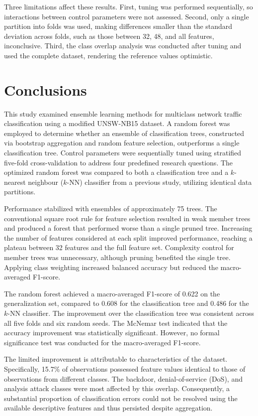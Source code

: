\documentclass[conference]{IEEEtran}
\begin{document}
Three limitations affect these results. First, tuning was performed sequentially, so interactions between control parameters were not assessed. Second, only a single partition into folds was used, making differences smaller than the standard deviation across folds, such as those between 32, 48, and all features, inconclusive. Third, the class overlap analysis was conducted after tuning and used the complete dataset, rendering the reference values optimistic.

\section{Conclusions}\label{sec:conclusions}
This study examined ensemble learning methods for multiclass network traffic classification using a modified UNSW-NB15 dataset. A random forest was employed to determine whether an ensemble of classification trees, constructed via bootstrap aggregation and random feature selection, outperforms a single classification tree. Control parameters were sequentially tuned using stratified five-fold cross-validation to address four predefined research questions. The optimized random forest was compared to both a classification tree and a $k$-nearest neighbour ($k$-NN) classifier from a previous study, utilizing identical data partitions.

Performance stabilized with ensembles of approximately 75 trees. The conventional square root rule for feature selection resulted in weak member trees and produced a forest that performed worse than a single pruned tree. Increasing the number of features considered at each split improved performance, reaching a plateau between 32 features and the full feature set. Complexity control for member trees was unnecessary, although pruning benefited the single tree. Applying class weighting increased balanced accuracy but reduced the macro-averaged F1-score.

The random forest achieved a macro-averaged F1-score of 0.622 on the generalization set, compared to 0.608 for the classification tree and 0.486 for the $k$-NN classifier. The improvement over the classification tree was consistent across all five folds and six random seeds. The McNemar test indicated that the accuracy improvement was statistically significant. However, no formal significance test was conducted for the macro-averaged F1-score.

The limited improvement is attributable to characteristics of the dataset. Specifically, 15.7\% of observations possessed feature values identical to those of observations from different classes. The backdoor, denial-of-service (DoS), and analysis attack classes were most affected by this overlap. Consequently, a substantial proportion of classification errors could not be resolved using the available descriptive features and thus persisted despite aggregation.
\end{document}

